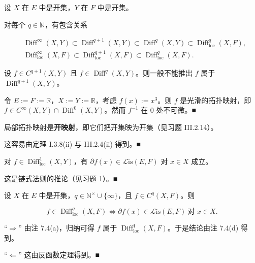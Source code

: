 \begin{remark}

设 $ X $ 在 $ E $ 中是开集，$ Y $ 在 $ F $ 中是开集。

\begin{items}
\item

对每个 $ q \in \mathbb{N} $，有包含关系

\begin{equation*}
\begin{aligned}
&\operatorname{Diff}^{\infty}(X, Y) \subset \operatorname{Diff}^{q+1}(X, Y) \subset \operatorname{Diff}^{q}(X, Y) \subset \operatorname{Diff}_{\mathrm{loc}}^{q}(X, F) , \\ &\operatorname{Diff}_{\mathrm{loc}}^{\infty}(X, F) \subset \operatorname{Diff}_{\mathrm{loc}}^{q+1}(X, F) \subset \operatorname{Diff}_{\mathrm{loc}}^{q}(X, F) .
\end{aligned}
\end{equation*}
\item

设 $ f \in C^{q+1}(X, Y) $ 且 $ f \in \operatorname{Diff}^{q}(X, Y) $。则一般不能推出 $ f $ 属于 $ \operatorname{Diff}^{q+1}(X, Y) $。

\proofhead
令 $ E := F := \mathbb{R} $，$ X := Y := \mathbb{R} $，考虑 $ f(x) := x^{3} $。则 $ f $ 是光滑的拓扑映射，即 $ f \in C^{\infty}(X, Y) \cap \operatorname{Diff}^{0}(X, Y) $。然而 $ f^{-1} $ 在 0 处不可微。\nobreak\hspace{0.35em}■
\item

局部拓扑映射是\textbf{开映射}，即它们把开集映为开集（见习题 III.2.14）。

\proofhead
这容易由定理 I.3.8(ii) 与 III.2.4(ii) 得到。\nobreak\hspace{0.35em}■
\item

对 $ f \in \operatorname{Diff}_{\mathrm{loc}}^{1}(X, Y) $，有 $ \partial f(x) \in \mathcal{L}\mathrm{is}(E, F) $ 对 $ x \in X $ 成立。

\proofhead
这是链式法则的推论（见习题 1）。\nobreak\hspace{0.35em}■
\end{items}

\end{remark}

\begin{corollary}

设 $ X $ 在 $ E $ 中是开集，$ q \in \mathbb{N}^{\times} \cup \{\infty\} $，且 $ f \in C^{q}(X, F) $。则

\[
f \in \operatorname{Diff}_{\mathrm{loc}}^{q}(X, F) \iff \partial f(x) \in \mathcal{L}\mathrm{is}(E, F) \ \text{对 } x \in X .
\]

\proofhead
“$ \Rightarrow $” 由注 7.4(a)，归纳可得 $ f $ 属于 $ \operatorname{Diff}_{\mathrm{loc}}^{1}(X, F) $。于是结论由注 7.4(d) 得到。

“$ \Leftarrow $” 这由反函数定理得到。\nobreak\hspace{0.35em}■
\end{corollary}

